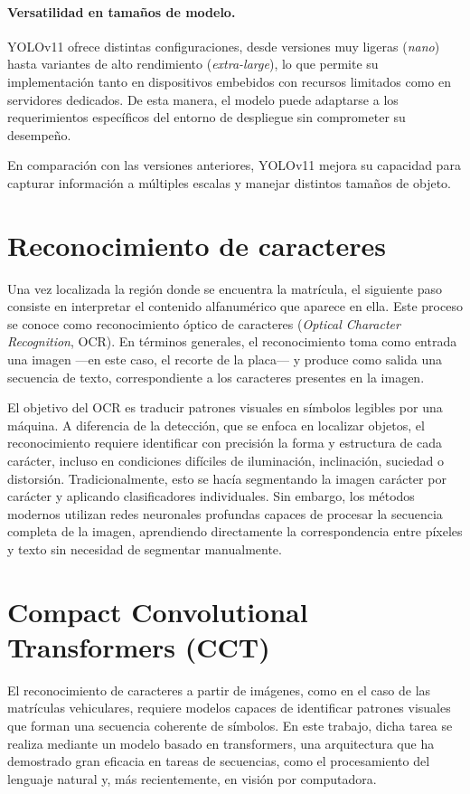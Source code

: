 \paragraph{Versatilidad en tamaños de modelo.} 
YOLOv11 ofrece distintas configuraciones,
desde versiones muy ligeras (\emph{nano}) hasta variantes de alto rendimiento (\emph{extra-large}), 
lo que permite su implementación tanto en dispositivos embebidos con recursos limitados como en servidores dedicados. 
De esta manera, el modelo puede adaptarse a los requerimientos específicos del entorno
de despliegue sin comprometer su desempeño.

En comparación con las versiones anteriores,
YOLOv11 mejora su capacidad para capturar información a múltiples escalas y manejar distintos tamaños de objeto. 

\section{Reconocimiento de caracteres}

Una vez localizada la región donde se encuentra la matrícula, 
el siguiente paso consiste en interpretar el contenido alfanumérico que aparece en ella. 
Este proceso se conoce como reconocimiento óptico de caracteres (\emph{Optical Character Recognition}, OCR). 
En términos generales, el reconocimiento toma como entrada una imagen 
---en este caso, el recorte de la placa--- y produce como salida una secuencia de texto, 
correspondiente a los caracteres presentes en la imagen.

El objetivo del OCR es traducir patrones visuales en símbolos legibles por una máquina. 
A diferencia de la detección, que se enfoca en localizar objetos, 
el reconocimiento requiere identificar con precisión la forma y estructura de cada carácter, 
incluso en condiciones difíciles de iluminación, inclinación, suciedad o distorsión. 
Tradicionalmente, esto se hacía segmentando la imagen carácter por carácter y aplicando clasificadores individuales. 
Sin embargo, los métodos modernos utilizan redes neuronales profundas capaces de procesar la secuencia completa de la imagen, 
aprendiendo directamente la correspondencia entre píxeles y texto sin necesidad de segmentar manualmente.

\section{Compact Convolutional Transformers (CCT)}

El reconocimiento de caracteres a partir de imágenes, como en el caso de las matrículas vehiculares, 
requiere modelos capaces de identificar patrones visuales que forman una secuencia coherente de símbolos. 
En este trabajo, dicha tarea se realiza mediante un modelo basado en transformers, 
una arquitectura que ha demostrado gran eficacia en tareas de secuencias, 
como el procesamiento del lenguaje natural y, más recientemente, en visión por computadora.

